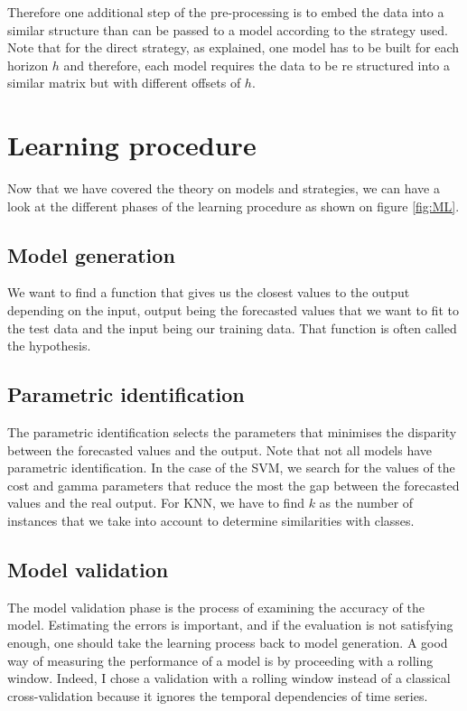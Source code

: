 \documentclass[11pt,a4paper,oneside]{book}
\begin{document}
Therefore one additional step of the pre-processing is to embed the data into a similar structure than can be passed to a model according to the strategy used. Note that for the direct strategy, as explained, one model has to be built for each horizon $h$ and therefore, each model requires the data to be re structured into a similar matrix but with different offsets of $h$.



\section{Learning procedure}

Now that we have covered the theory on models and strategies, we can have a look at the different phases of the learning procedure as shown on figure \ref{fig:ML}.


\subsection{Model generation}

We want to find a function that gives us the closest values to the output depending on the input, output being the forecasted values that we want to fit to the test data and the input being our training data. That function is often called the hypothesis. \cite{BenTaieb}


\subsection{Parametric identification}

The parametric identification selects the parameters that minimises the disparity between the forecasted values and the output. Note that not all models have parametric identification. In the case of the SVM, we search for the values of the cost and gamma parameters that reduce the most the gap between the forecasted values and the real output. For KNN, we have to find $k$ as the number of instances that we take into account to determine similarities with classes. \cite{BenTaieb}


\subsection{Model validation}

The model validation phase is the process of examining the accuracy of the model. Estimating the errors is important, and if the evaluation is not satisfying enough, one should take the learning process back to model generation. A good way of measuring the performance of a model is by proceeding with a rolling window. Indeed, I chose a validation with a rolling window instead of a classical cross-validation because it ignores the temporal dependencies of time series. \cite{BenTaieb}
\end{document}
